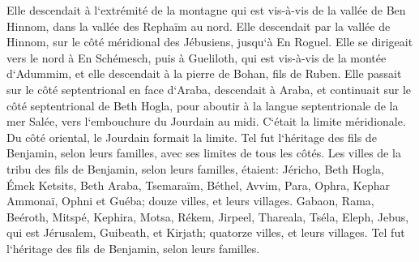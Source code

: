 \verse Elle descendait à l`extrémité de la montagne qui est vis-à-vis de la vallée de Ben Hinnom, dans la vallée des Rephaïm au nord. Elle descendait par la vallée de Hinnom, sur le côté méridional des Jébusiens, jusqu`à En Roguel. 
\verse Elle se dirigeait vers le nord à En Schémesch, puis à Gueliloth, qui est vis-à-vis de la montée d`Adummim, et elle descendait à la pierre de Bohan, fils de Ruben. 
\verse Elle passait sur le côté septentrional en face d`Araba, descendait à Araba, 
\verse et continuait sur le côté septentrional de Beth Hogla, pour aboutir à la langue septentrionale de la mer Salée, vers l`embouchure du Jourdain au midi. C`était la limite méridionale. 
\verse Du côté oriental, le Jourdain formait la limite. Tel fut l`héritage des fils de Benjamin, selon leurs familles, avec ses limites de tous les côtés. 
\verse Les villes de la tribu des fils de Benjamin, selon leurs familles, étaient: Jéricho, Beth Hogla, Émek Ketsits, 
\verse Beth Araba, Tsemaraïm, Béthel, 
\verse Avvim, Para, Ophra, 
\verse Kephar Ammonaï, Ophni et Guéba; douze villes, et leurs villages. 
\verse Gabaon, Rama, Beéroth, 
\verse Mitspé, Kephira, Motsa, 
\verse Rékem, Jirpeel, Thareala, 
\verse Tséla, Eleph, Jebus, qui est Jérusalem, Guibeath, et Kirjath; quatorze villes, et leurs villages. Tel fut l`héritage des fils de Benjamin, selon leurs familles. 

\chapter{}

